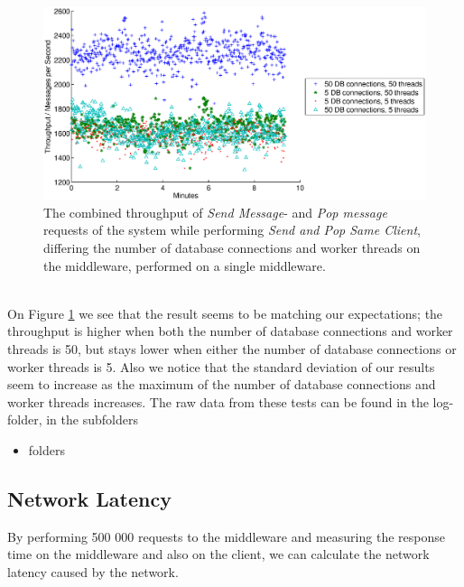 \documentclass{article}
\begin{document}
             \begin{figure}[H]
                 \centering
                 \includegraphics[scale=0.50]{throughput_vs_dbconns}
                 \caption{The combined throughput of \textit{Send Message}- and \textit{Pop message} requests of the system while performing \textit{Send and Pop Same Client}, differing the number of database connections and worker threads on the middleware, performed on a single middleware.}
                 \label{fig:throughput_vs_dbconns}
             \end{figure}
             ~\\
             On Figure \ref{fig:throughput_vs_dbconns} we see that the result seems to be matching our expectations; the throughput is higher when both the number of database connections and worker threads is 50, but stays lower when either the number of database connections or worker threads is 5. Also we notice that the standard deviation of our results seem to increase as the maximum of the number of database connections and worker threads increases.
            The raw data from these tests can be found in the log-folder, in the subfolders
            \begin{itemize}
                \item folders
            \end{itemize}
            
        \subsection{Network Latency}
        By performing 500 000 requests to the middleware and measuring the response time on the middleware and also on the client, we can calculate the network latency caused by the network.
\end{document}

